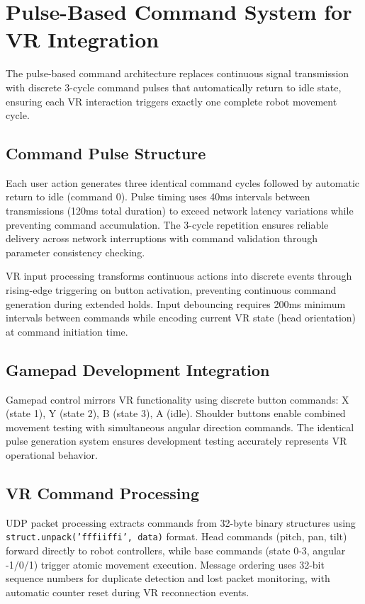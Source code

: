 \section{Pulse-Based Command System for VR Integration}

The pulse-based command architecture replaces continuous signal transmission with discrete 3-cycle command pulses that automatically return to idle state, ensuring each VR interaction triggers exactly one complete robot movement cycle.

\subsection{Command Pulse Structure}

Each user action generates three identical command cycles followed by automatic return to idle (command 0). Pulse timing uses 40ms intervals between transmissions (120ms total duration) to exceed network latency variations while preventing command accumulation. The 3-cycle repetition ensures reliable delivery across network interruptions with command validation through parameter consistency checking.

VR input processing transforms continuous actions into discrete events through rising-edge triggering on button activation, preventing continuous command generation during extended holds. Input debouncing requires 200ms minimum intervals between commands while encoding current VR state (head orientation) at command initiation time.

\subsection{Gamepad Development Integration}

Gamepad control mirrors VR functionality using discrete button commands: X (state 1), Y (state 2), B (state 3), A (idle). Shoulder buttons enable combined movement testing with simultaneous angular direction commands. The identical pulse generation system ensures development testing accurately represents VR operational behavior.

\subsection{VR Command Processing}

UDP packet processing extracts commands from 32-byte binary structures using \texttt{struct.unpack('fffiiffi', data)} format. Head commands (pitch, pan, tilt) forward directly to robot controllers, while base commands (state 0-3, angular -1/0/1) trigger atomic movement execution. Message ordering uses 32-bit sequence numbers for duplicate detection and lost packet monitoring, with automatic counter reset during VR reconnection events.

